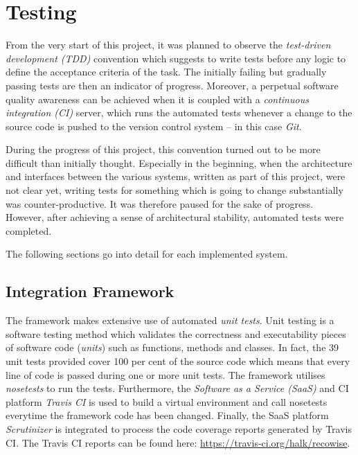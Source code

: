 \chapter{Testing}

From the very start of this project, it was planned to observe the \emph{test-driven development (TDD)} convention which suggests to write tests before any logic to define the acceptance criteria of the task. The initially failing but gradually passing tests are then an indicator of progress. Moreover, a perpetual software quality awareness can be achieved when it is coupled with a \emph{continuous integration (CI)} server, which runs the automated tests whenever a change to the source code is pushed to the version control system -- in this case \emph{Git}.

During the progress of this project, this convention turned out to be more difficult than initially thought. Especially in the beginning, when the architecture and interfaces between the various systems, written as part of this project, were not clear yet, writing tests for something which is going to change substantially was counter-productive. It was therefore paused for the sake of progress. However, after achieving a sense of architectural stability, automated tests were completed.

The following sections go into detail for each implemented system.

\section{Integration Framework}

The framework makes extensive use of automated \emph{unit tests}. Unit testing is a software testing method which validates the correctness and executability pieces of software code (\emph{units}) such as functions, methods and classes. In fact, the 39 unit tests provided cover 100 per cent of the source code which means that every line of code is passed during one or more unit tests. The framework utilises \emph{nosetests} to run the tests. Furthermore, the \emph{Software as a Service (SaaS)} and CI platform \emph{Travis CI} is used to build a virtual environment and call nosetests everytime the framework code has been changed. Finally, the SaaS platform \emph{Scrutinizer} is integrated to process the code coverage reports generated by Travis CI. The Travis CI reports can be found here: \url{https://travis-ci.org/halk/recowise}.

